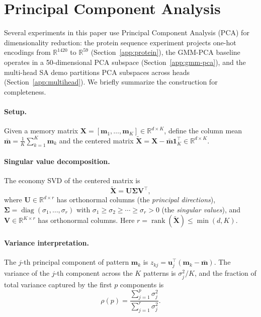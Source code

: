 \section{Principal Component Analysis}\label{app:pca}

Several experiments in this paper use Principal Component Analysis (PCA) for dimensionality reduction: the protein sequence experiment projects one-hot encodings from $\mathbb{R}^{1420}$ to $\mathbb{R}^{59}$ (Section~\ref{app:protein}), the GMM-PCA baseline operates in a 50-dimensional PCA subspace (Section~\ref{app:gmm-pca}), and the multi-head SA demo partitions PCA subspaces across heads (Section~\ref{app:multihead}). We briefly summarize the construction for completeness.

\paragraph{Setup.}
Given a memory matrix $\mathbf{X} = [\mathbf{m}_1,\dots,\mathbf{m}_K] \in \mathbb{R}^{d \times K}$, define the column mean $\bar{\mathbf{m}} = \frac{1}{K}\sum_{k=1}^{K}\mathbf{m}_k$ and the centered matrix $\tilde{\mathbf{X}} = \mathbf{X} - \bar{\mathbf{m}}\mathbf{1}_K^\top \in \mathbb{R}^{d \times K}$.

\paragraph{Singular value decomposition.}
The economy SVD of the centered matrix is
\begin{equation}\label{eq:pca-svd}
    \tilde{\mathbf{X}} = \mathbf{U}\boldsymbol{\Sigma}\mathbf{V}^\top,
\end{equation}
where $\mathbf{U} \in \mathbb{R}^{d \times r}$ has orthonormal columns (the \emph{principal directions}), $\boldsymbol{\Sigma} = \operatorname{diag}(\sigma_1,\dots,\sigma_r)$ with $\sigma_1 \ge \sigma_2 \ge \cdots \ge \sigma_r > 0$ (the \emph{singular values}), and $\mathbf{V} \in \mathbb{R}^{K \times r}$ has orthonormal columns. Here $r = \operatorname{rank}(\tilde{\mathbf{X}}) \le \min(d, K)$.

\paragraph{Variance interpretation.}
The $j$-th principal component of pattern $\mathbf{m}_k$ is $z_{kj} = \mathbf{u}_j^\top(\mathbf{m}_k - \bar{\mathbf{m}})$. The variance of the $j$-th component across the $K$ patterns is $\sigma_j^2 / K$, and the fraction of total variance captured by the first $p$ components is
\begin{equation}\label{eq:pca-variance}
    \rho(p) = \frac{\sum_{j=1}^{p}\sigma_j^2}{\sum_{j=1}^{r}\sigma_j^2}.
\end{equation}

